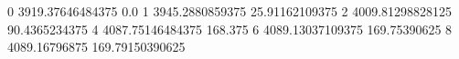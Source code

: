 0 3919.37646484375 0.0
1 3945.2880859375 25.91162109375
2 4009.81298828125 90.4365234375
4 4087.75146484375 168.375
6 4089.13037109375 169.75390625
8 4089.16796875 169.79150390625
